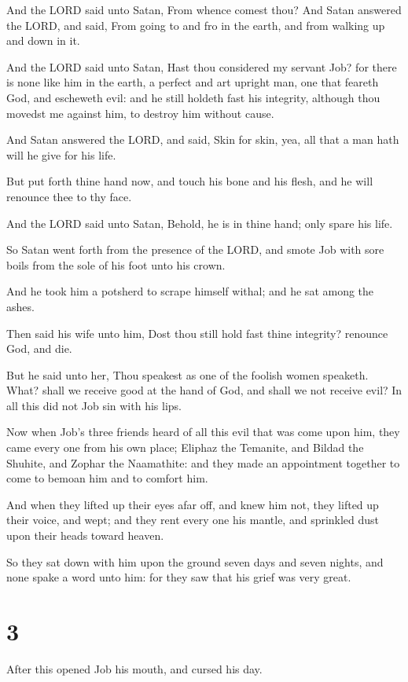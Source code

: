 \documentclass[12pt,oneside]{book}
\begin{document}
And the LORD said unto Satan, From whence comest thou? And Satan answered the LORD, and said, From going to and fro in the earth, and from walking up and down in it.

And the LORD said unto Satan, Hast thou considered my servant Job? for there is none like him in the earth, a perfect and art upright man, one that feareth God, and escheweth evil: and he still holdeth fast his integrity, although thou movedst me against him, to destroy him without cause.

And Satan answered the LORD, and said, Skin for skin, yea, all that a man hath will he give for his life.

But put forth thine hand now, and touch his bone and his flesh, and he will renounce thee to thy face.

And the LORD said unto Satan, Behold, he is in thine hand; only spare his life.

So Satan went forth from the presence of the LORD, and smote Job with sore boils from the sole of his foot unto his crown.

And he took him a potsherd to scrape himself withal; and he sat among the ashes.

Then said his wife unto him, Dost thou still hold fast thine integrity? renounce God, and die.

But he said unto her, Thou speakest as one of the foolish women speaketh. What? shall we receive good at the hand of God, and shall we not receive evil? In all this did not Job sin with his lips.

Now when Job's three friends heard of all this evil that was come upon him, they came every one from his own place; Eliphaz the Temanite, and Bildad the Shuhite, and Zophar the Naamathite: and they made an appointment together to come to bemoan him and to comfort him.

And when they lifted up their eyes afar off, and knew him not, they lifted up their voice, and wept; and they rent every one his mantle, and sprinkled dust upon their heads toward heaven.

So they sat down with him upon the ground seven days and seven nights, and none spake a word unto him: for they saw that his grief was very great.

\chapter{3}
After this opened Job his mouth, and cursed his day.
\end{document}
